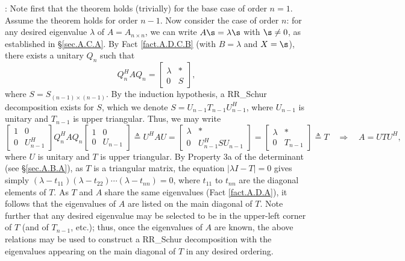 \/: Note first that the theorem holds
(trivially) for the base case of order $n=1$.  Assume the theorem
holds for order $n-1$.  Now consider the case of order $n$: for any
desired eigenvalue $\lambda$ of $A=A_{n\times n}$, we can write
$A\s=\lambda \s$ with $\s\ne 0$, as established in \S \ref{sec.A.C.A}.
By Fact \ref{fact.A.D.C.B} (with $B=\lambda$ and $X=\s$), there exists
a unitary $Q_{n}$ such that
\begin{equation*}
Q_{n}^{H} A Q_{n} =\begin{bmatrix} \lambda & * \\ 0 & S \end{bmatrix},
\end{equation*}
where $S=S_{(n-1)\times (n-1)}$.  By the induction hypothesis, a RR_Schur
decomposition exists for $S$, which we denote $S=U_{n-1} T_{n-1}
U^{H}_{n-1}$, where $U_{n-1}$ is unitary and $T_{n-1}$ is upper
triangular.  Thus, we may write
\begin{equation*}
    \begin{bmatrix} 1 & 0 \\ 0 & U^{H}_{n-1} \end{bmatrix} Q_{n}^{H} A Q_{n}
		\begin{bmatrix} 1 & 0 \\ 0 & U_{n-1}     \end{bmatrix} \triangleq U^{H} A U =
		\begin{bmatrix} \lambda & * \\ 0 & U^{H}_{n-1} S U_{n-1} \end{bmatrix} =
		\begin{bmatrix} \lambda & * \\ 0 & T_{n-1} \end{bmatrix} \triangleq
		    T \quad \Rightarrow \quad A = U T U^{H},
\end{equation*}
where $U$ is unitary and $T$ is upper triangular.  By Property 3a of
the determinant (see \S \ref{sec.A.B.A}), as $T$ is a triangular
matrix, the equation $|\lambda I-T|=0$ gives simply
$(\lambda-t_{11})(\lambda-t_{22})\cdots(\lambda-t_{nn})=0$, where
$t_{11}$ to $t_{nn}$ are the diagonal elements of $T$.  As $T$ and $A$
share the same eigenvalues (Fact \ref{fact.A.D.A}), it follows that
the eigenvalues of $A$ are listed on the main diagonal of $T$.  Note
further that any desired eigenvalue may be selected to be in the
upper-left corner of $T$ (and of $T_{n-1}$, etc.); thus, once the
eigenvalues of $A$ are known, the above relations may be used to
construct a RR_Schur decomposition with the eigenvalues appearing on the
main diagonal of $T$ in any desired ordering.   \endproof \vskip0.1in


